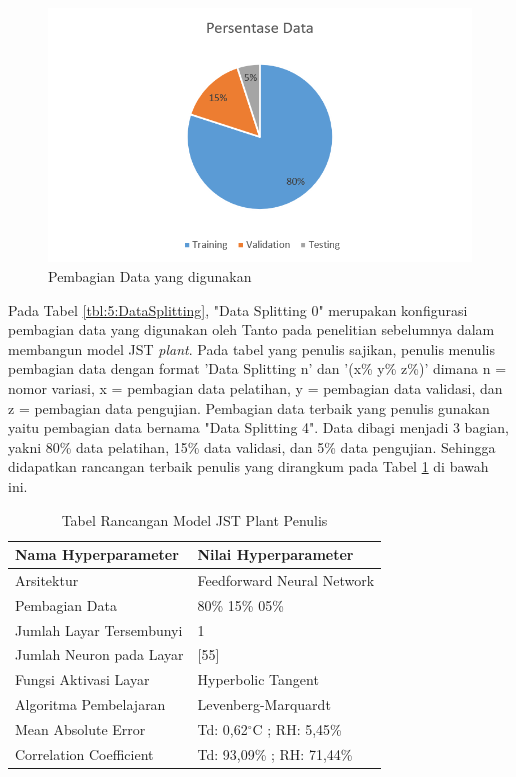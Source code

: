 \begin{figure}[!h]
	\centering
	\includegraphics[width=1\textwidth]{figures/DataSplittingFinal}
	\caption{Pembagian Data yang digunakan}
	\label{fig:5:DataSplittingFinal}
\end{figure}

Pada Tabel \ref{tbl:5:DataSplitting}, "Data Splitting 0" merupakan konfigurasi pembagian data yang digunakan oleh Tanto pada penelitian sebelumnya dalam membangun model JST \textit{plant}. Pada tabel yang penulis sajikan, penulis menulis pembagian data dengan format 'Data Splitting n' dan '(x\% y\% z\%)' dimana n = nomor variasi, x = pembagian data pelatihan, y = pembagian data validasi, dan z = pembagian data pengujian. Pembagian data terbaik yang penulis gunakan yaitu pembagian data bernama "Data Splitting 4". Data dibagi menjadi 3 bagian, yakni 80\% data pelatihan, 15\% data validasi, dan 5\% data pengujian. Sehingga didapatkan rancangan terbaik penulis yang dirangkum pada Tabel \ref{tbl:5:NNPlantRidhan} di bawah ini.

\begin{table}[!h]
	\caption{Tabel Rancangan Model JST Plant Penulis}
	\label{tbl:5:NNPlantRidhan}
	\centering
	\begin{tabular}{|p{5.7cm}|p{5cm}|}
		\hline
		\textbf{Nama Hyperparameter} & \textbf{Nilai Hyperparameter} \\ \hline
		Arsitektur & Feedforward Neural Network \\ \hline
		Pembagian Data & 80\% 15\% 05\% \\ \hline 
		Jumlah Layar Tersembunyi & 1 \\ \hline
		Jumlah Neuron pada Layar & [55] \\ \hline
		Fungsi Aktivasi Layar & Hyperbolic Tangent \\ \hline
		Algoritma Pembelajaran & Levenberg-Marquardt \\ \hline
		Mean Absolute Error & Td: 0,62$^\circ$C ; RH: 5,45\% \\ \hline
		Correlation Coefficient & Td: 93,09\% ; RH: 71,44\% \\ \hline
	\end{tabular}
\end{table}

